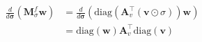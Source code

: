\begin{equation}
\begin{aligned}
\frac{d}{d \boldsymbol{\sigma}}
\left(
    \mathbf{M}^f_\sigma \mathbf{w}
\right) &=
\frac{d}{d\boldsymbol{\sigma}}
\left(
    \text{diag}\left(
        \mathbf{A}_v^\top (\mathbf{v} \odot \sigma)
    \right)
    \mathbf{w}
\right) \\
&= \text{diag}\left(
    \mathbf{w}
\right)
\mathbf{A}_v^\top
\text{diag}\left(
    \mathbf{v}
\right)
\end{aligned}
\end{equation}
